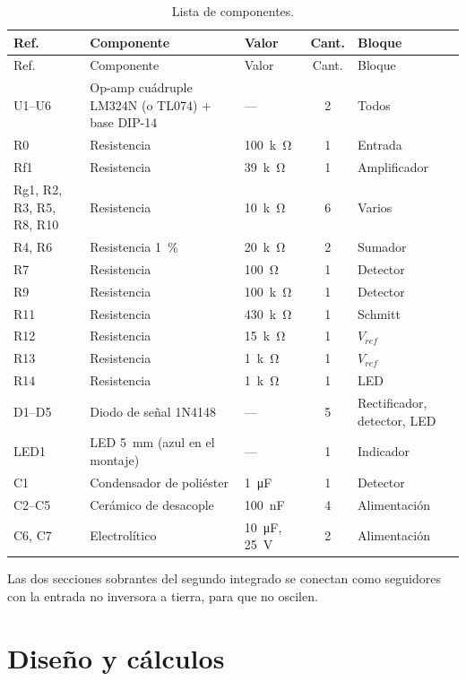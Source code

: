 \documentclass[11pt,letterpaper]{article}
\newcommand{\Vref}{V_{ref}}
\begin{document}
{\small
\begin{longtable}{@{}>{\raggedright}p{3.0cm}>{\raggedright}p{5.6cm}>{\raggedright}p{2.4cm}c>{\raggedright\arraybackslash}p{2.7cm}@{}}
\caption{Lista de componentes.}\label{tab:bom}\\
\toprule
Ref. & Componente & Valor & Cant. & Bloque \\
\midrule
\endfirsthead
\toprule
Ref. & Componente & Valor & Cant. & Bloque \\
\midrule
\endhead
U1--U6 & Op-amp cuádruple LM324N (o TL074) + base DIP-14 & --- & 2 & Todos \\
R0 & Resistencia & \SI{100}{k\ohm} & 1 & Entrada \\
Rf1 & Resistencia & \SI{39}{k\ohm} & 1 & Amplificador \\
Rg1, R2, R3, R5, R8, R10 & Resistencia & \SI{10}{k\ohm} & 6 & Varios \\
R4, R6 & Resistencia \SI{1}{\percent} & \SI{20}{k\ohm} & 2 & Sumador \\
R7 & Resistencia & \SI{100}{\ohm} & 1 & Detector \\
R9 & Resistencia & \SI{100}{k\ohm} & 1 & Detector \\
R11 & Resistencia & \SI{430}{k\ohm} & 1 & Schmitt \\
R12 & Resistencia & \SI{15}{k\ohm} & 1 & $\Vref$ \\
R13 & Resistencia & \SI{1}{k\ohm} & 1 & $\Vref$ \\
R14 & Resistencia & \SI{1}{k\ohm} & 1 & LED \\
D1--D5 & Diodo de señal 1N4148 & --- & 5 & Rectificador, detector, LED \\
LED1 & LED \SI{5}{mm} (azul en el montaje) & --- & 1 & Indicador \\
C1 & Condensador de poliéster & \SI{1}{\micro F} & 1 & Detector \\
C2--C5 & Cerámico de desacople & \SI{100}{nF} & 4 & Alimentación \\
C6, C7 & Electrolítico & \SI{10}{\micro F}, \SI{25}{V} & 2 & Alimentación \\
\bottomrule
\end{longtable}
}

Las dos secciones sobrantes del segundo integrado se conectan como seguidores con la entrada no inversora a tierra, para que no oscilen.

\section{Diseño y cálculos}
\end{document}
